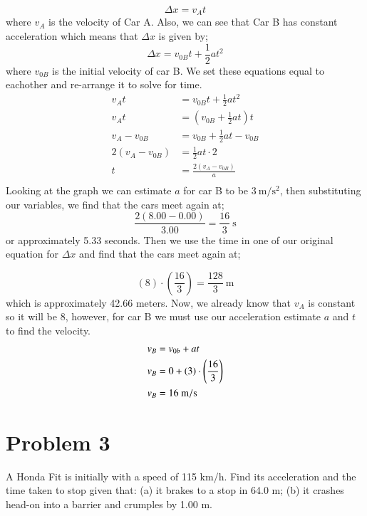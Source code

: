 \documentclass{article}
\begin{document}
\[
	\Delta x = v_A t
\]
where $v_A$ is the velocity of Car A. Also, we can see that Car B has constant acceleration which means that $\Delta x$ is given by;
\[
	\Delta x = v_{0B} t + \frac{1}{2} a t^2
\]
where $v_{0B}$ is the initial velocity of car B. We set these equations equal to eachother and re-arrange it to solve for time.
\begin{align*}
	v_A t &= v_{0B} t + \frac{1}{2} a t^2 \\
	v_A t &= \left( v_{0B} + \frac{1}{2} a t \right) t \\
	v_A - v_{0B} &= v_{0B} + \frac{1}{2} a t  - v_{0B} \\
	2 \left( v_A - v_{0B} \right) &= \frac{1}{2} a t \cdot 2 \\
	t &= \frac{2 \left( v_A - v_{0B} \right)}{a} \\
\end{align*}
Looking at the graph we can estimate $a$ for car B to be $3\ \unit{\meter\per\second^2}$, then substituting our variables, we find that the cars meet again at;
\[
	\frac{2 \left( 8.00 - 0.00 \right)}{3.00} = \frac{16}{3}\ \unit{\second}
\]
or approximately 5.33 seconds. Then we use the time in one of our original equation for $\Delta x$ and find that the cars meet again at;

\[
	\left( 8 \right) \cdot \left(\frac{16}{3}\right) = \frac{128}{3}\ \unit{\meter}
\]
which is approximately 42.66 meters. Now, we already know that $v_A$ is constant so it will be 8, however, for car B we must use our acceleration estimate $a$ and $t$ to find the velocity.
\begin{align*}
	v_B &= v_{0b} + at \\
	v_B &= 0 + \left( 3 \right) \cdot \left( \frac{16}{3} \right) \\
	v_B &= 16\ \unit{{\meter\per\second}}
\end{align*}

\section*{Problem 3}
A Honda Fit is initially with a speed of 115 km/h. Find its acceleration and the time taken
to stop given that: (a) it brakes to a stop in 64.0 m; (b) it crashes head-on into a barrier and
crumples by 1.00 m.
\end{document}
